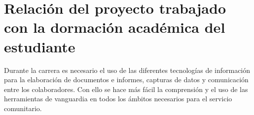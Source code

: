 \chapter{Relación del proyecto trabajado con la dormación académica del estudiante}

    Durante la carrera es necesario el uso de las diferentes tecnologías de información para la elaboración de documentos e informes, capturas de datos y comunicación entre los colaboradores. Con ello se hace más fácil la comprensión y el uso de las herramientas de vanguardia en todos los ámbitos necesarios para el servicio comunitario.
    

        
        
        
        
        
    
    
 
\pagebreak